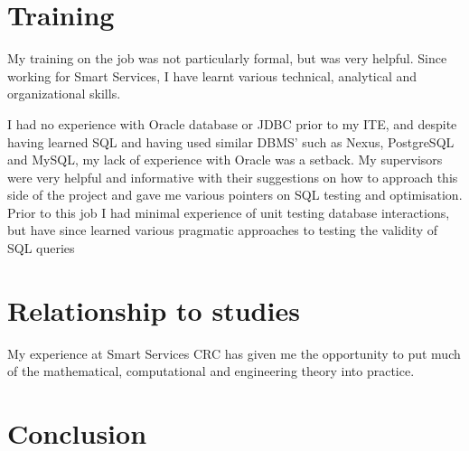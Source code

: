 \documentclass{report}
\begin{document}
\chapter{Training}
My training on the job was not particularly formal, but was very helpful. Since working for Smart Services, I have learnt various technical, analytical and organizational skills.

I had no experience with Oracle database or JDBC prior to my ITE, and despite having learned SQL and having used similar DBMS' such as Nexus, PostgreSQL and MySQL, my lack of experience with Oracle was a setback. My supervisors were very helpful and informative with their suggestions on how to approach this side of the project and gave me various pointers on SQL testing and optimisation. Prior to this job I had minimal experience of unit testing database interactions, but have since learned various pragmatic approaches to testing the validity of SQL queries

\chapter{Relationship to studies}
My experience at Smart Services CRC has given me the opportunity to put much of the mathematical, computational and engineering theory into practice.

\chapter{Conclusion}
\end{document}
